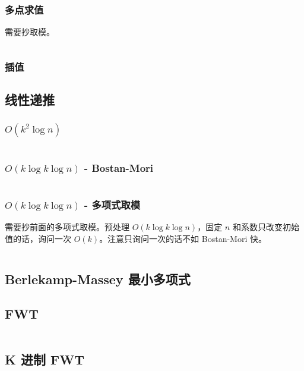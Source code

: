 \documentclass[titlepage, a4paper, 11pt]{article}
\begin{document}
\begin{spacing}{1.15}
					\subsubsection{多点求值}
						需要抄取模。
						\inputminted{cpp}{src/Math/多点求值.cpp}
					\subsubsection{插值}
						
				\subsection{线性递推}
					\subsubsection*{$O(k^2 \log n)$}
						\inputminted{cpp}{src/Math/线性递推.cpp}
					\subsubsection*{$O(k \log k \log n)$ - Bostan-Mori}
						\inputminted{cpp}{src/Math/快速线性递推-bostan-mori.cpp}
					\subsubsection*{$O(k \log k \log n)$ - 多项式取模}
						需要抄前面的多项式取模。预处理 $O(k \log k \log n)$，固定 $n$ 和系数只改变初始值的话，询问一次 $O(k)$。注意只询问一次的话不如 Bostan-Mori 快。
						\inputminted{cpp}{src/Math/快速线性递推-多项式取模.cpp}
				\subsection{Berlekamp-Massey 最小多项式}
					
				\subsection{FWT}
					\inputminted{cpp}{src/Math/FWT.cpp}
				\subsection{K 进制 FWT}
					\inputminted{cpp}{src/tbr/fwt.cpp}

\end{spacing}
\end{document}
